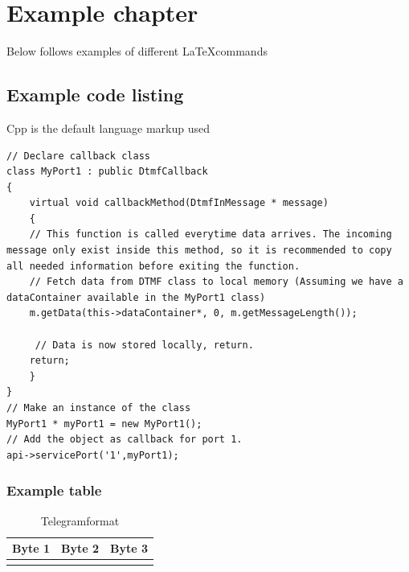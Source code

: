 \chapter{Example chapter}
Below follows examples of different \LaTeX commands
\section{Example code listing}
Cpp is the default language markup used




\begin{lstlisting}[language={[ANSI]C++},caption={Example code},label={lst:examplecode}]
// Declare callback class
class MyPort1 : public DtmfCallback
{
	virtual void callbackMethod(DtmfInMessage * message)
	{
    // This function is called everytime data arrives. The incoming message only exist inside this method, so it is recommended to copy all needed information before exiting the function.
    // Fetch data from DTMF class to local memory (Assuming we have a dataContainer available in the MyPort1 class)
    m.getData(this->dataContainer*, 0, m.getMessageLength());

     // Data is now stored locally, return.
    return;
	}
}
// Make an instance of the class
MyPort1 * myPort1 = new MyPort1();
// Add the object as callback for port 1.
api->servicePort('1',myPort1);
\end{lstlisting}



\subsection{Example table}

\begin{table}[htb]								%
	\centering
	\begin{tabular}{c|c|c}					%
	Byte 1 & Byte 2 & Byte 3 \\			%
	\hline													%
	\verb@TYPE@ & \verb@KOMMANDO@ & \verb@DATA@ \\
	\end{tabular}
	\caption{Telegramformat}				%
	\label{tab:telegramformat}			%
\end{table}






